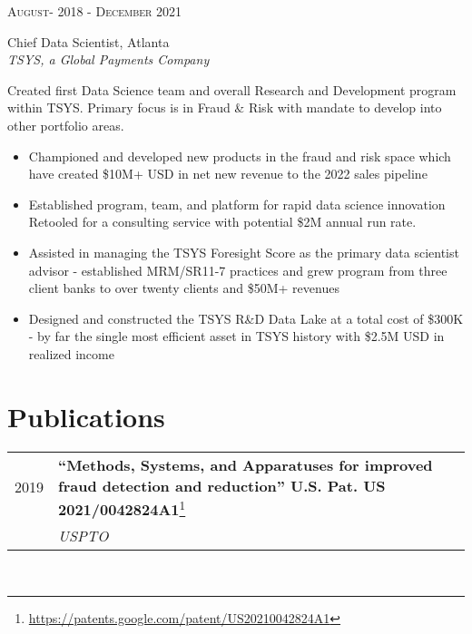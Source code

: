 \documentclass[10pt]{article} %
\begin{document}
\begin{minipage}[t]{0.5\textwidth}
{\raggedleft\textsc{August- 2018 - December 2021}\par}

{\raggedright\large Chief Data Scientist, Atlanta\\ 
\textit{TSYS, a Global Payments Company}\\[5pt]}

\normalsize{Created first Data Science team and overall Research and Development program within TSYS. Primary focus is in Fraud \& Risk with mandate to develop into other portfolio areas. \\
\begin{itemize}
\item Championed and developed new products in the fraud and risk space which have created \$10M+ USD in net new revenue to the 2022 sales pipeline
\item Established program, team, and platform for rapid data science innovation Retooled for a consulting service with potential \$2M annual run rate.  
\item Assisted in managing the TSYS Foresight Score as the primary data scientist advisor - established MRM/SR11-7 practices and grew program from three client banks to over twenty clients and \$50M+ revenues
\item Designed and constructed the TSYS R\&D Data Lake at a total cost of \$300K - by far the single most efficient asset in TSYS history with \$2.5M USD in realized income
\end{itemize}}







\section{Publications} 

\begin{tabular}{rl}
2019 & \parbox{0.75\textwidth}{\textbf{“Methods, Systems, and Apparatuses for improved fraud detection and reduction” U.S. Pat. US 2021/0042824A1}\footnote{\url{https://patents.google.com/patent/US20210042824A1}}}\\
& \textit{USPTO} \\
\end{tabular}\\[10pt]
\end{minipage} %
\end{document}
